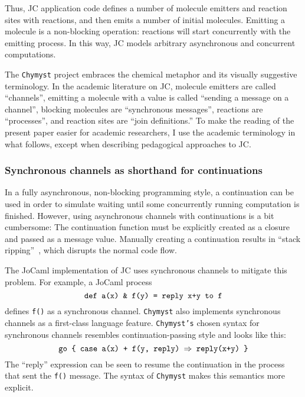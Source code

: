 \documentclass[sigplan,10pt,review,anonymous]{acmart}\settopmatter{printfolios=true}
\begin{document}
Thus, JC application code defines a number of molecule emitters and
reaction sites with reactions, and then emits a number of initial
molecules. Emitting a molecule is a non-blocking operation: reactions
will start concurrently with the emitting process. In this way, JC
models arbitrary asynchronous and concurrent computations.

The \texttt{Chymyst} project embraces the chemical metaphor and its
visually suggestive terminology. In the academic literature on JC,
molecule emitters are called ``channels'', emitting a molecule with
a value is called ``sending a message on a channel'', blocking molecules
are ``synchronous messages'', reactions are ``processes'', and
reaction sites are ``join definitions.'' To make the reading of
the present paper easier for academic researchers, I use the academic
terminology in what follows, except when describing pedagogical approaches
to JC. 

\subsubsection{Synchronous channels as shorthand for continuations}

In a fully asynchronous, non-blocking programming style, a continuation
can be used in order to simulate waiting until some concurrently running computation
is finished. However, using asynchronous channels with continuations
is a bit cumbersome: The continuation function must be explicitly
created as a closure and passed as a message value. Manually creating
a continuation results in ``stack ripping''~\citep{Ady2002}, which
disrupts the normal code flow. 

The JoCaml implementation of JC uses synchronous channels to mitigate
this problem. For example, a JoCaml process 
\[
\text{\texttt{def a(x) \& f(y) = reply x+y to f}}
\]
defines \texttt{f()} as a synchronous channel. \texttt{Chymyst} also
implements synchronous channels as a first-class language feature.
\texttt{Chymyst's} chosen syntax for synchronous channels resembles
continuation-passing style and looks like this:
\[
\text{\texttt{go \{ case a(x) + f(y, reply) \ensuremath{\Rightarrow} reply(x+y) \}}}
\]
The ``reply'' expression can be seen to resume the continuation
in the process that sent the \texttt{f()} message. The syntax of \texttt{Chymyst}
makes this semantics more explicit.
\end{document}

